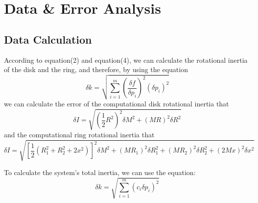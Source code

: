 \documentclass[12pt]{article}
\begin{document}
	\section{Data \& Error Analysis}
	\subsection{Data Calculation}
	According to equation(2) and equation(4), we can calculate the rotational inertia of the disk and the ring, and therefore, by using the equation
	\begin{equation}
		\delta k = \sqrt{\sum_{i=1}^{m}(\frac{\delta f}{\delta p_i})^2(\delta p_i)^2}
	\end{equation}
	we can calculate the error of the computational disk rotational inertia that
	\begin{equation}
		\delta I = \sqrt{(\frac{1}{2}R^2)^2\delta M^2 + (MR)^2\delta R^2}
	\end{equation}
	and the computational ring rotational inertia that
	\begin{equation}
		\delta I = \sqrt{[\frac{1}{2}(R_1^2+R_2^2+2x^2)]^2\delta M^2+(MR_1)^2\delta R_1^2+(MR_2)^2\delta R_2^2+(2Mx)^2\delta x^2}
	\end{equation}\par 
	To calculate the system's total inertia, we can use the equation:
	\begin{equation}
		\delta k = \sqrt{\sum_{i=1}^{m}(c_i\delta p_i)^2}
	\end{equation}
	\begin{table}[H]
		\centering
	\end{table}\par
\end{document}
